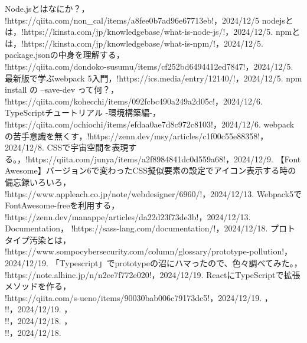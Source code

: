 \documentclass[autodetect-engine,dvi=dvipdfmx,ja=standard,
               a4j,11pt]{bxjsarticle}
\begin{document}
\begin{thebibliography}{99}
    Node.jsとはなにか？， \spverb!https://qiita.com/non_cal/items/a8fee0b7ad96e67713eb!，2024/12/5
    nodejsとは，\spverb!https://kinsta.com/jp/knowledgebase/what-is-node-js/!，2024/12/5.
    npmとは，\spverb!https://kinsta.com/jp/knowledgebase/what-is-npm/!，2024/12/5.
    package.jsonの中身を理解する，\\ \spverb!https://qiita.com/dondoko-susumu/items/cf252bd6494412ed7847!，2024/12/5.
    最新版で学ぶwebpack 5入門，\spverb!https://ics.media/entry/12140/!，2024/12/5.
    npm install の --save-dev って何？，\\ \spverb!https://qiita.com/kohecchi/items/092fcbc490a249a2d05c!，2024/12/6.
    TypeScriptチュートリアル -環境構築編-，\\ \spverb!https://qiita.com/ochiochi/items/efdaa0ae7d8c972c8103!，2024/12/6.
    webpackの苦手意識を無くす，\spverb!https://zenn.dev/msy/articles/c1f00c55e88358!，2024/12/8.
   CSSで宇宙空間を表現する。，\spverb!https://qiita.com/junya/items/a2f8984841dc0d559a68!，2024/12/9.
   【Font Awesome】バージョン6で変わったCSS擬似要素の設定でアイコン表示する時の備忘録いろいろ，\\ \spverb!https://www.appleach.co.jp/note/webdesigner/6960/!，2024/12/13.
   Webpack5でFontAwesome-freeを利用する，\\ \spverb!https://zenn.dev/manappe/articles/da22d23f73de3b!，2024/12/13.
   Documentation， \spverb!https://sass-lang.com/documentation/!，2024/12/18.
   プロトタイプ汚染とは，\\ \spverb!https://www.sompocybersecurity.com/column/glossary/prototype-pollution!，2024/12/19.
   「Typescript」でprototypeの沼にハマったので、色々調べてみた。，\\ \spverb!https://note.alhinc.jp/n/n2ee7f772e020!，2024/12/19.
   ReactにTypeScriptで拡張メソッドを作る，\\ \spverb!https://qiita.com/s-ueno/items/90030bab006c79173dc5!，2024/12/19.
   ，\\ \spverb!!，2024/12/19.
   ，\\ \spverb!!，2024/12/18.
   ，\\ \spverb!!，2024/12/18.

\end{thebibliography}
\end{document}
